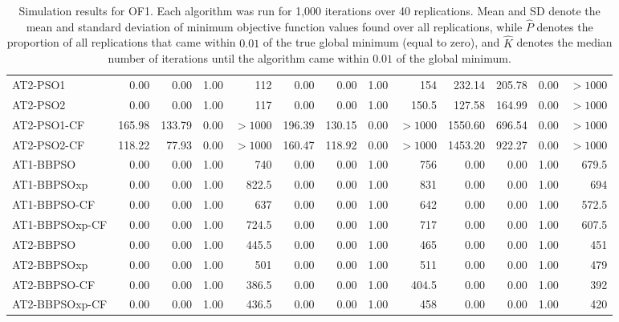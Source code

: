 \documentclass[cmbright]{staauth}
\numberwithin{table}{section}
\begin{document}
\begin{table}[ht]
\begin{tabular}{l|rrrr|rrrr|rrrr}
   \hline
AT2-PSO1 & 0.00 & 0.00 & 1.00 & 112 & 0.00 & 0.00 & 1.00 & 154 & 232.14 & 205.78 & 0.00 & $> 1000$ \\
  AT2-PSO2 & 0.00 & 0.00 & 1.00 & 117 & 0.00 & 0.00 & 1.00 & 150.5 & 127.58 & 164.99 & 0.00 & $> 1000$ \\
  AT2-PSO1-CF & 165.98 & 133.79 & 0.00 & $> 1000$ & 196.39 & 130.15 & 0.00 & $> 1000$ & 1550.60 & 696.54 & 0.00 & $> 1000$ \\
  AT2-PSO2-CF & 118.22 & 77.93 & 0.00 & $> 1000$ & 160.47 & 118.92 & 0.00 & $> 1000$ & 1453.20 & 922.27 & 0.00 & $> 1000$ \\
   \hline
AT1-BBPSO & 0.00 & 0.00 & 1.00 & 740 & 0.00 & 0.00 & 1.00 & 756 & 0.00 & 0.00 & 1.00 & 679.5 \\
  AT1-BBPSOxp & 0.00 & 0.00 & 1.00 & 822.5 & 0.00 & 0.00 & 1.00 & 831 & 0.00 & 0.00 & 1.00 & 694 \\
  AT1-BBPSO-CF & 0.00 & 0.00 & 1.00 & 637 & 0.00 & 0.00 & 1.00 & 642 & 0.00 & 0.00 & 1.00 & 572.5 \\
  AT1-BBPSOxp-CF & 0.00 & 0.00 & 1.00 & 724.5 & 0.00 & 0.00 & 1.00 & 717 & 0.00 & 0.00 & 1.00 & 607.5 \\
   \hline
AT2-BBPSO & 0.00 & 0.00 & 1.00 & 445.5 & 0.00 & 0.00 & 1.00 & 465 & 0.00 & 0.00 & 1.00 & 451 \\
  AT2-BBPSOxp & 0.00 & 0.00 & 1.00 & 501 & 0.00 & 0.00 & 1.00 & 511 & 0.00 & 0.00 & 1.00 & 479 \\
  AT2-BBPSO-CF & 0.00 & 0.00 & 1.00 & 386.5 & 0.00 & 0.00 & 1.00 & 404.5 & 0.00 & 0.00 & 1.00 & 392 \\
  AT2-BBPSOxp-CF & 0.00 & 0.00 & 1.00 & 436.5 & 0.00 & 0.00 & 1.00 & 458 & 0.00 & 0.00 & 1.00 & 420 \\
   \hline
\end{tabular}
\endgroup
\caption{Simulation results for OF1. Each algorithm was run for 1,000 iterations over 40 replications. Mean and SD denote the mean and standard deviation of minimum objective function values found over all replications, while $\widehat{P}$ denotes the proportion of all replications that came within $0.01$ of the true global minimum (equal to zero), and $\widehat{K}$ denotes the median number of iterations until the algorithm came within $0.01$ of the global minimum.}
\label{tab:psosim1}
\end{table}
\end{document}
